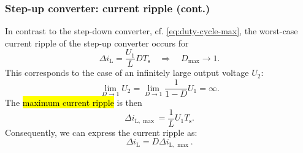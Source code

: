 \begin{frame}
    \frametitle{Step-up converter: current ripple (cont.)}
    In contrast to the step-down converter, cf. \eqref{eq:duty-cycle-max}, the worst-case current ripple of the step-up converter occurs for 
    \begin{equation}
        \Delta i_\mathrm{L} =  \frac{U_1}{L}DT_\mathrm{s} \quad \Rightarrow \quad D_\mathrm{max} \rightarrow 1.
        \label{eq:ripple-current-duty-cycle-max-step-up_converter}
    \end{equation}\pause
    This corresponds to the case of an infinitely large output voltage $U_2$:
    \begin{equation}
        \lim_{D\rightarrow1}U_2 = \lim_{D\rightarrow1} \frac{1}{1-D}U_1=\infty.
    \end{equation}\pause
    The \hl{maximum current ripple} is then
    \begin{equation}
        \Delta i_\mathrm{L,\max} = \frac{1}{L}U_1T_\mathrm{s}.
        \label{eq:current-ripple-max-step-up}
    \end{equation}\pause
    Consequently, we can express the current ripple as:
    \begin{equation}
        \Delta i_\mathrm{L} = D \Delta i_\mathrm{L,\max}.
    \end{equation}
\end{frame}


